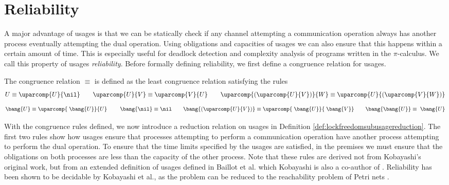 \section{Reliability}
A major advantage of usages is that we can be statically check if any channel attempting a communication operation always has another process eventually attempting the dual operation. Using obligations and capacities of usages we can also ensure that this happens within a certain amount of time. This is especially useful for deadlock detection and complexity analysis of programs written in the $\pi$-calculus. We call this property of usages \textit{reliability}. Before formally defining reliability, we first define a congruence relation for usages.

\begin{defi}
    The congruence relation $\equiv$ is defined as the least congruence relation satisfying the rules
    $$
        U \equiv \uparcomp{U}{\nil}\kern2em \uparcomp{U}{V} \equiv \uparcomp{V}{U}\kern2em\uparcomp{(\uparcomp{U}{V})}{W} \equiv \uparcomp{U}{(\uparcomp{V}{W})}
    $$
    \vspace{-1em}
    $$
        \bang{U} \equiv \uparcomp{\;\bang{U}}{U}\kern2em\;\bang{\nil} \equiv \nil\kern2em \bang{(\uparcomp{U}{V})} \equiv \uparcomp{\;\bang{U}}{\;\bang{V}}\kern2em \bang{\bang{U}} \equiv \;\bang{U}
    $$
    
    \label{def:lockfreedomsubusagecongruence}
\end{defi}

With the congruence rules defined, we now introduce a reduction relation on usages in Definition \ref{def:lockfreedomsubusagereduction}. The first two rules show how usages ensure that processes attempting to perform a communication operation have another process attempting to perform the dual operation. To ensure that the time limits specified by the usages are satisfied, in the premises we must ensure that the obligations on both processes are less than the capacity of the other process. Note that these rules are derived not from Kobayashi's original work, but from an extended definition of usages defined in Baillot et al. which Kobayashi is also a co-author of \cite{BaillotEtAl2021}. Reliability has been shown to be decidable by Kobayashi et al., as the problem can be reduced to the reachability problem of Petri nets \cite{KobayashiEtAl2000}.

